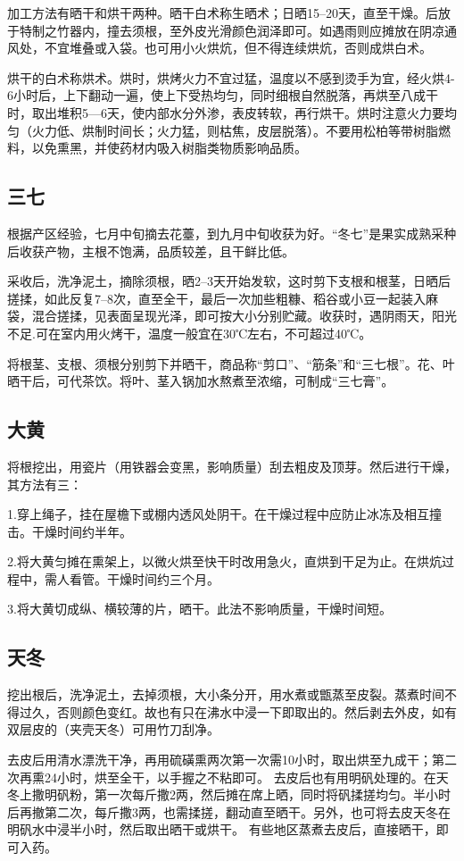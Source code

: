 \documentclass{ctexbook}
\begin{document}
加工方法有晒干和烘干两种。晒干白术称生晒术；日晒15--20天，直至干燥。后放于特制之竹器内，撞去须根，至外皮光滑颜色润泽即可。如遇雨则应摊放在阴凉通风处，不宜堆叠或入袋。也可用小火烘炕，但不得连续烘炕，否则成烘白术。

烘干的白术称烘术。烘时，烘烤火力不宜过猛，温度以不感到烫手为宜，经火烘4-6小时后，上下翻动一遍，使上下受热均匀，同时细根自然脱落，再烘至八成干时，取出堆积5—6天，使内部水分外渗，表皮转软，再行烘干。烘时注意火力要均匀（火力低、烘制时间长；火力猛，则枯焦，皮层脱落）。不要用松柏等带树脂燃料，以免熏黑，并使药材内吸入树脂类物质影响品质。
\subsection{三七}
根据产区经验，七月中旬摘去花薹，到九月中旬收获为好。“冬七”是果实成熟采种后收获产物，主根不饱满，品质较差，且干鲜比低。

采收后，洗净泥土，摘除须根，晒2--3天开始发软，这时剪下支根和根茎，日晒后搓揉，如此反复7--8次，直至全干，最后一次加些粗糠、稻谷或小豆一起装入麻袋，混合搓揉，见表面呈现光泽，即可按大小分别贮藏。收获时，遇阴雨天，阳光不足.可在室内用火烤干，温度一般宜在30℃左右，不可超过40℃。

将根茎、支根、须根分别剪下并晒干，商品称“剪口”、“筋条”和“三七根”。花、叶晒干后，可代茶饮。将叶、茎入锅加水熬煮至浓缩，可制成“三七膏”。
\subsection{大黄}
将根挖出，用瓷片（用铁器会变黑，影响质量）刮去粗皮及顶芽。然后进行干燥，其方法有三：

1.穿上绳子，挂在屋檐下或棚内透风处阴干。在干燥过程中应防止冰冻及相互撞击。干燥时间约半年。

2.将大黄匀摊在熏架上，以微火烘至快干时改用急火，直烘到干足为止。在烘炕过程中，需人看管。干燥时间约三个月。

3.将大黄切成纵、横较薄的片，晒干。此法不影响质量，干燥时间短。
\subsection{天冬}
挖出根后，洗净泥土，去掉须根，大小条分开，用水煮或甑蒸至皮裂。蒸煮时间不得过久，否则颜色变红。故也有只在沸水中浸一下即取出的。然后剥去外皮，如有双层皮的（夹壳天冬）可用竹刀刮净。

去皮后用清水漂洗干净，再用硫磺熏两次第一次需10小时，取出烘至九成干；第二次再熏24小时，烘至全干，以手握之不粘即可。
去皮后也有用明矾处理的。在天冬上撒明矾粉，第一次每斤撒2两，然后摊在席上晒，同时将矾揉搓均匀。半小时后再撤第二次，每斤撒3两，也需揉搓，翻动直至晒干。另外，也可将去皮天冬在明矾水中浸半小时，然后取出晒干或烘干。
有些地区蒸煮去皮后，直接晒干，即可入药。
\end{document}
